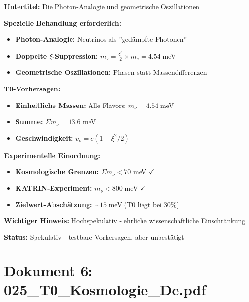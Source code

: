 	\begin{documentbox}
		\textbf{Untertitel:} Die Photon-Analogie und geometrische Oszillationen
		
		\textbf{Spezielle Behandlung erforderlich:}
		\begin{itemize}
			\item \textbf{Photon-Analogie:} Neutrinos als ''gedämpfte Photonen''
			\item \textbf{Doppelte $\xi$-Suppression:} $m_\nu = \frac{\xi^2}{2} \times m_e = 4.54$ meV
			\item \textbf{Geometrische Oszillationen:} Phasen statt Massendifferenzen
		\end{itemize}
		
		\textbf{T0-Vorhersagen:}
		\begin{itemize}
			\item \textbf{Einheitliche Massen:} Alle Flavors: $m_\nu = 4.54$ meV
			\item \textbf{Summe:} $\Sigma m_\nu = 13.6$ meV
			\item \textbf{Geschwindigkeit:} $v_\nu = c(1 - \xi^2/2)$
		\end{itemize}
		
		\textbf{Experimentelle Einordnung:}
		\begin{itemize}
			\item \textbf{Kosmologische Grenzen:} $\Sigma m_\nu < 70$ meV $\checkmark$
			\item \textbf{KATRIN-Experiment:} $m_\nu < 800$ meV $\checkmark$
			\item \textbf{Zielwert-Abschätzung:} $\sim 15$ meV (T0 liegt bei 30\%)
		\end{itemize}
		
		\textbf{Wichtiger Hinweis:} Hochspekulativ - ehrliche wissenschaftliche Einschränkung
		
		\textbf{Status:} Spekulativ - testbare Vorhersagen, aber unbestätigt
	\end{documentbox}
	
	\section{Dokument 6: 025\_T0\_Kosmologie\_De.pdf}
	
